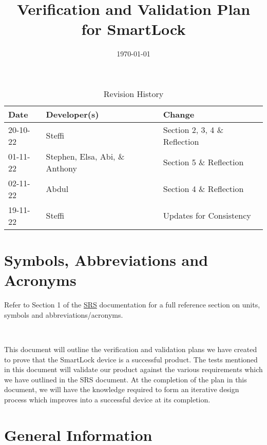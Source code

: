 \documentclass[12pt, titlepage]{article}
\title{Verification and Validation Plan for SmartLock\\\progname}
\author{\authname}
\date{\today}
\begin{document}
	


\maketitle


\newpage


\begin{table}[hp]
\caption{Revision History} \label{TblRevisionHistory}
\begin{tabularx}{\textwidth}{llX}
\toprule
\textbf{Date} & \textbf{Developer(s)} & \textbf{Change}\\
\midrule
20-10-22 & Steffi & Section 2, 3, 4 \& Reflection\\
01-11-22 & Stephen, Elsa, Abi, \& Anthony & Section 5 \& Reflection\\
02-11-22 & Abdul & Section 4 \& Reflection\\
19-11-22 & Steffi & Updates for Consistency\\
\bottomrule
\end{tabularx}
\end{table}

\newpage

\tableofcontents

\listoftables


\newpage


\section{Symbols, Abbreviations and Acronyms}

Refer to Section 1 of the \href{https://github.com/NevoAbigail/Capstone/blob/main/docs/SRS/SRS.pdf}{SRS} documentation for a full reference section on units, symbols and abbreviations/acronyms.

\-\

This document will outline the verification and validation plans we have created to prove that the SmartLock device is a successful product. The tests mentioned in this document will validate our product against the various requirements which we have outlined in the SRS document. At the completion of the plan in this document, we will have the knowledge required to form an iterative design process which improves into a successful device at its completion. 

\section{General Information}
\end{document}
